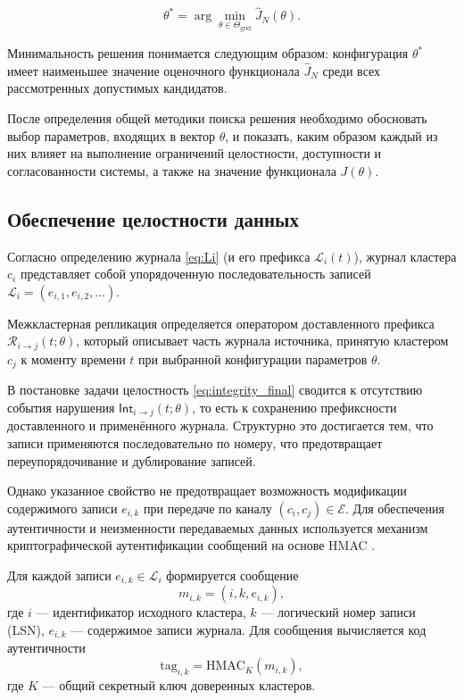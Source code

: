 \[
\theta^{*}
=
\arg\min_{\theta \in \Theta_{\mathrm{grid}}}
\widehat{J}_N(\theta).
\]

Минимальность решения понимается следующим образом:
конфигурация $\theta^{*}$ имеет наименьшее значение
оценочного функционала $\widehat{J}_N$
среди всех рассмотренных допустимых кандидатов.

После определения общей методики поиска решения
необходимо обосновать выбор параметров,
входящих в вектор $\theta$,
и показать,
каким образом каждый из них влияет
на выполнение ограничений целостности,
доступности и согласованности системы,
а также на значение функционала $J(\theta)$.

\subsection{Обеспечение целостности данных}

Согласно определению журнала \eqref{eq:Li} (и его префикса $\mathcal{L}_i(t)$),
журнал кластера $c_i$ представляет собой упорядоченную последовательность записей
$\mathcal{L}_i=(e_{i,1},e_{i,2},\dots)$.

Межкластерная репликация определяется оператором доставленного префикса
$\mathcal{R}_{i\to j}(t;\theta)$,
который описывает часть журнала источника, принятую кластером $c_j$
к моменту времени $t$ при выбранной конфигурации параметров $\theta$.

В постановке задачи целостность \eqref{eq:integrity_final}
сводится к отсутствию события нарушения
$\mathsf{Int}_{i\to j}(t;\theta)$,
то есть к сохранению префиксности доставленного и применённого журнала.
Структурно это достигается тем, что записи применяются последовательно по номеру,
что предотвращает переупорядочивание и дублирование записей.

Однако указанное свойство не предотвращает возможность модификации
содержимого записи $e_{i,k}$ при передаче по каналу $(c_i,c_j)\in\mathcal{E}$.
Для обеспечения аутентичности и неизменности передаваемых данных
используется механизм криптографической аутентификации сообщений
на основе HMAC \cite{RFC2104}.

Для каждой записи $e_{i,k} \in \mathcal{L}_i$ формируется сообщение
\[
m_{i,k} = (i, k, e_{i,k}),
\]
где $i$ --- идентификатор исходного кластера,
$k$ --- логический номер записи (LSN),
$e_{i,k}$ --- содержимое записи журнала.
Для сообщения вычисляется код аутентичности
\[
\mathrm{tag}_{i,k}=\mathrm{HMAC}_{K}(m_{i,k}),
\]
где $K$ --- общий секретный ключ доверенных кластеров.

